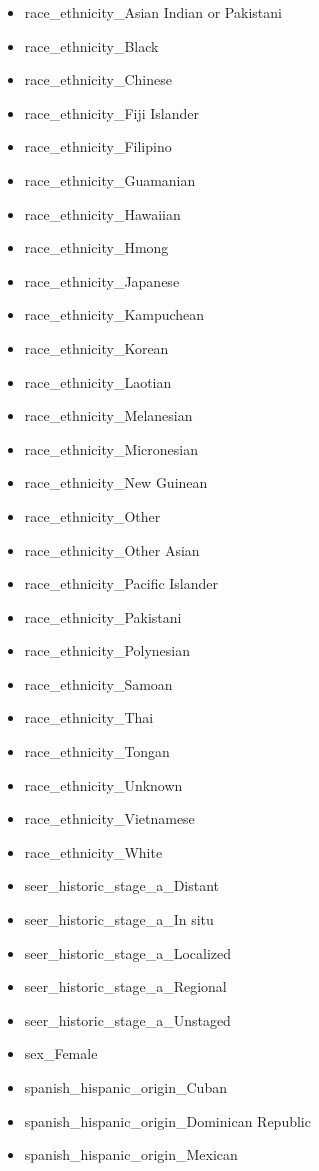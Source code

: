 \documentclass[10pt,letterpaper]{article}
\begin{document}
\begin{itemize}[noitemsep]
\item race\_ethnicity\_Asian Indian or Pakistani
\item race\_ethnicity\_Black
\item race\_ethnicity\_Chinese
\item race\_ethnicity\_Fiji Islander
\item race\_ethnicity\_Filipino
\item race\_ethnicity\_Guamanian
\item race\_ethnicity\_Hawaiian
\item race\_ethnicity\_Hmong
\item race\_ethnicity\_Japanese
\item race\_ethnicity\_Kampuchean
\item race\_ethnicity\_Korean
\item race\_ethnicity\_Laotian
\item race\_ethnicity\_Melanesian
\item race\_ethnicity\_Micronesian
\item race\_ethnicity\_New Guinean
\item race\_ethnicity\_Other
\item race\_ethnicity\_Other Asian
\item race\_ethnicity\_Pacific Islander
\item race\_ethnicity\_Pakistani
\item race\_ethnicity\_Polynesian
\item race\_ethnicity\_Samoan
\item race\_ethnicity\_Thai
\item race\_ethnicity\_Tongan
\item race\_ethnicity\_Unknown
\item race\_ethnicity\_Vietnamese
\item race\_ethnicity\_White
\item seer\_historic\_stage\_a\_Distant
\item seer\_historic\_stage\_a\_In situ
\item seer\_historic\_stage\_a\_Localized
\item seer\_historic\_stage\_a\_Regional
\item seer\_historic\_stage\_a\_Unstaged
\item sex\_Female
\item spanish\_hispanic\_origin\_Cuban
\item spanish\_hispanic\_origin\_Dominican Republic
\item spanish\_hispanic\_origin\_Mexican

\end{itemize}
\end{document}
